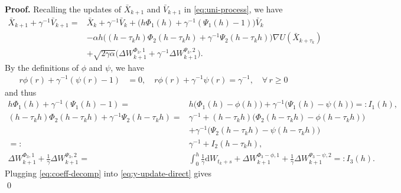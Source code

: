 \documentclass[12pt]{article}
\numberwithin{equation}{section}
\renewenvironment{proof}%
  {\begin{trivlist}%
   \item[]\ignorespaces}%
  {\qed\end{trivlist}}
\newcommand{\dd}{\mathrm{d}}
\begin{document}
\begin{proof}
\textbf{Proof.}
Recalling the updates of $\bar{X}_{k+1}$ and $\bar{V}_{k+1}$ in \eqref{eq:uni-process}, we have
\begin{equation}
\label{eq:y-update-direct}
\begin{aligned}
\bar{X}_{k+1}
+
\gamma^{-1}\bar{V}_{k+1}
=&
\bar{X}_k
+
\gamma^{-1}\bar{V}_k
+
\Big(
h\Phi_1(h)
+
\gamma^{-1}(\Psi_1(h)-1)
\Big)\bar{V}_k
\\
&-
\alpha h
\Big(
(h-\tau_kh)\Phi_2(h-\tau_kh)
+
\gamma^{-1}\Psi_2(h-\tau_kh)
\Big)
\nabla U(\bar{X}_{k+\tau_k})
\\
&+
\sqrt{2\gamma\alpha}
\Big(
\Delta W_{k+1}^{\Phi_3,1}
+
\gamma^{-1}\Delta W_{k+1}^{\Psi_3,2}
\Big).
\end{aligned}
\end{equation}
By the definitions of $\phi$ and $\psi$, we have
\begin{equation}
\label{eq:cancellation}
\begin{aligned}
r\phi(r)
+
\gamma^{-1}(\psi(r)-1)
& =
0,
\quad  
r\phi(r)+\gamma^{-1}\psi(r)
 =
\gamma^{-1},
\quad 
\forall \, r \ge 0
\end{aligned}
\end{equation}
and thus
\begin{equation}
\label{eq:coeff-decomp}
\begin{aligned}
h\Phi_1(h)
+
\gamma^{-1}(\Psi_1(h)-1)
=   & 
h\big(\Phi_1(h)-\phi(h)\big)
+
\gamma^{-1}\big(\Psi_1(h)-\psi(h)\big)
=:  I_{1} (h),
\\
(h-\tau_kh)\Phi_2(h-\tau_kh)
+
\gamma^{-1}\Psi_2(h-\tau_kh)
=  &
\gamma^{-1}
+
(h-\tau_kh)
\big(\Phi_2(h-\tau_kh)
-
\phi(h-\tau_kh)
\big)
\\  &
+
\gamma^{-1}\big(\Psi_2(h-\tau_kh)-\psi(h-\tau_kh)\big)
\\ 
=: & 
\gamma^{-1}
+
I_{2} (h-\tau_kh),
\\
\Delta W^{\Phi_3,1}_{k+1}
+
\tfrac{1}{\gamma}\Delta W^{\Psi_3,2}_{k+1}
=  &
\int_0^h\tfrac{1}{\gamma}\dd W_{t_k+s}
+
\Delta W^{\Phi_3-\phi,1}_{k+1}
+
\tfrac{1}{\gamma}
\Delta W^{\Psi_3-\psi,2}_{k+1} 
=:
I_{3} (h).
\end{aligned}
\end{equation}
Plugging \eqref{eq:coeff-decomp} into \eqref{eq:y-update-direct} gives 
\begin{equation}
\label{eq:second-term-decomposition}

\end{equation}
\end{proof}
\end{document}
